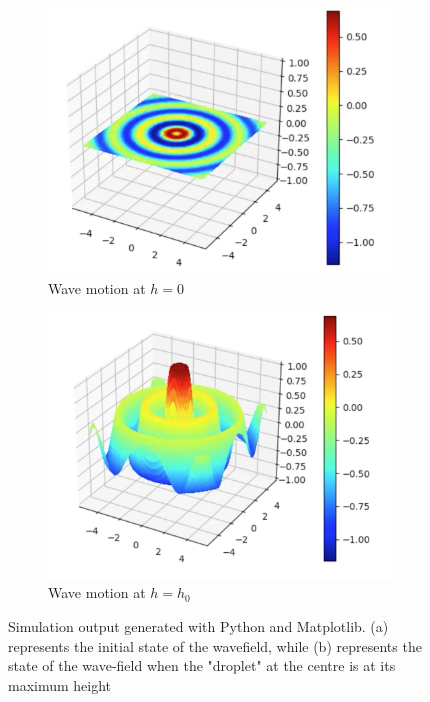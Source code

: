 \begin{figure}[h]
    \begin{subfigure}{0.5\textwidth}
        \centering
        \includegraphics[width=\linewidth]{simulation/basich0.png}
        \caption{Wave motion at $h=0$}
    \end{subfigure}
    \begin{subfigure}{0.5\textwidth}
        \centering
        \includegraphics[width=\linewidth]{simulation/basichmax.png}
        \caption{Wave motion at $h=h_0$}
    \end{subfigure}
\caption{Simulation output generated with Python and Matplotlib. (a) represents the initial state of the wavefield, while (b) represents the state of the wave-field when the "droplet" at the centre is at its maximum height}
\label{fig:basicAnimation}
\end{figure}

